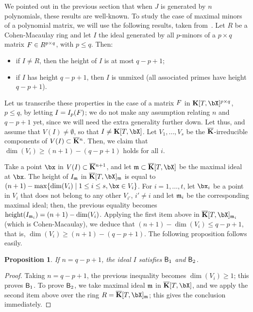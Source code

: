 \documentclass[12pt]{article}
\newtheorem{proposition}[definition]{Proposition}
\begin{document}
We pointed out in the previous section that when $J$ is generated by
$n$ polynomials, these results are well-known. To study the case of
maximal minors of a polynomial matrix, we will use the following
results, taken from~\cite[Section~6]{EN62}. Let $R$ be a
Cohen-Macaulay ring and let $I$ the ideal generated by all $p$-minors
of a $p\times q$ matrix ${F} \in R^{p\times q}$, with $p \le q$. Then:
\begin{itemize}
\item if $I \ne R$, then the height of $I$ is at most $q-p+1$;
\item if $I$ has height $q-p+1$, then $I$ is unmixed (all associated
  primes have height $q-p+1$).
\end{itemize}
Let us transcribe these properties in the case of a matrix ${F}$ in
$\KK[T,\bX]^{p \times q}$, $p \le q$, by letting $I=I_p({F})$; we do not make any
assumption relating $n$ and $q-p+1$ yet, since we will need the extra
generality further down. Let thus, and assume that $V(I)\ne
\emptyset$, so that $I \ne \KK[T,\bX]$. Let $V_1,\dots,V_s$ be the
$\overline{\mathbf{K}}$-irreducible components of $V(I)\subset \overline{\mathbf{K}}{}^n$.  Then, we
claim that $\dim(V_i) \ge (n+1) -(q-p+1)$ holds for all $i$.

Take a point $\bx$ in $V(I)\subset \overline{\mathbf{K}}{}^{n+1}$, and let $\m \subset
\KKbar[T,\bX]$ be the maximal ideal at $\bx$. The height of
$I_{\mathfrak{m}}$ in $\KKbar[T,\bX]_\m$ is equal to $(n+1)-\max\{ \dim(V_i)
\mid 1 \le i \le s, \bx \in V_i\}$. For $i=1,\dots,t$, let $\bx_i$
be a point in $V_i$ that does not belong to any other $V_{i'}$, $i'
\ne i$ and let $\mathfrak{m}_i$ be the corresponding maximal ideal; then, the
previous equality becomes ${\rm height}(I_{\mathfrak{m}_i})=(n+1)-\dim(V_i)$.
Applying the first item above in $\KKbar[T,\bX]_{\m_i}$ (which
is Cohen-Macaulay), we deduce that $(n+1)-\dim(V_i) \le q-p+1$, that is,
$\dim(V_i) \ge (n+1) -(q-p+1)$. The following proposition
follows easily.

\begin{proposition}
  If $n=q-p+1$, the ideal $I$ satisfies $\mathsf{B}_1$ and $\mathsf{B}_2$.
\end{proposition}
\begin{proof}
  Taking $n=q-p+1$, the previous inequality becomes $\dim(V_i) \ge 1$;
  this proves $\mathsf{B}_1$.  To prove $\mathsf{B}_2$, we take maximal
  ideal $\mathfrak{m}$ in $\KKbar[T,\bX]$, and we apply the second item above
  over the ring $R=\KKbar[T,\bX]_\m$; this gives the conclusion
  immediately.
\end{proof}
\end{document}

